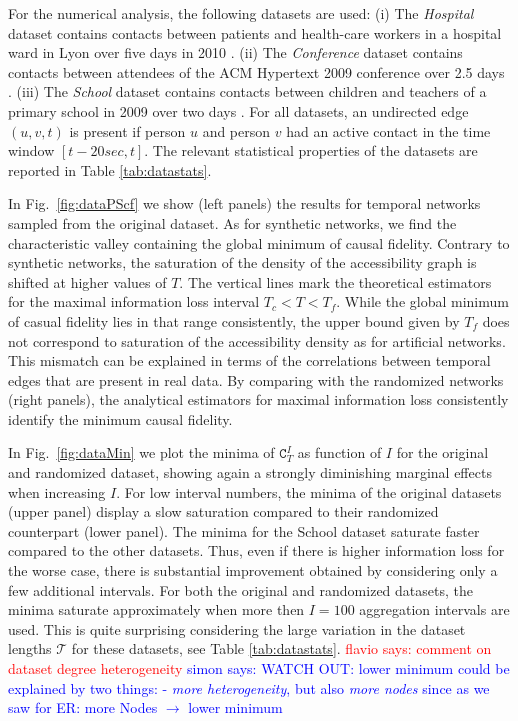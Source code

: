 \documentclass[%
 reprint,
 amsmath,amssymb,
 aps,
]{revtex4-2}
\newcommand{\fla}[1]{\textcolor{red}{flavio says: #1}}
\newcommand{\simon}[1]{\textcolor{blue}{simon says: #1}}
\begin{document}
For the numerical analysis, the following datasets are used:
(i) The \emph{Hospital} dataset contains contacts between patients and health-care workers in a hospital ward in Lyon over five days in 2010 \cite{hospital}.
(ii) The \emph{Conference} dataset contains contacts between attendees of the ACM Hypertext 2009 conference over 2.5 days \cite{hypertext}. 
(iii) The \emph{School} dataset contains contacts between children and teachers of a primary school in 2009 over two days \cite{primaryschool2,primaryschool1}. 
For all datasets, an undirected edge $(u,v,t)$ is present if person $u$ and person $v$ had an active contact in the time window $[t-20sec, t]$.
The relevant statistical properties of the datasets are reported in Table \ref{tab:datastats}.





In Fig.~\ref{fig:dataPScf} we show (left panels) the results for temporal networks sampled from the original dataset. As for synthetic networks, we find the characteristic valley containing the global minimum of causal fidelity. 
Contrary to synthetic networks, the saturation of the density of the accessibility graph is shifted at higher values of $T$. The vertical lines mark the theoretical estimators for the maximal information loss interval $T_c<T<T_f$. 
While the global minimum of casual fidelity  lies in that range consistently, the upper bound given by $T_f$ does not correspond to saturation of the accessibility density as for artificial networks. This mismatch can be explained in terms of the correlations between temporal edges that are present in real data.
By comparing with the randomized networks (right panels), the analytical estimators for maximal information loss consistently identify the minimum causal fidelity.

In Fig.~\ref{fig:dataMin} we plot the minima of $\mathtt{C}^I_T$ as function of $I$ for the original and randomized dataset, showing again a strongly diminishing marginal effects when increasing $I$.
For low interval numbers, the minima of the original datasets (upper panel) display a slow saturation compared to their randomized counterpart (lower panel).
The minima for the School dataset saturate faster compared to the other datasets. Thus, even if there is higher information loss for the worse case, there is substantial improvement obtained by considering only a few additional intervals.
For both the original and randomized datasets, the minima saturate approximately when more then $I=100$ aggregation intervals are used. This is quite surprising considering the large variation in the dataset lengths $\mathcal{T}$ for these datasets, see Table \ref{tab:datastats}. 
\fla{comment on dataset degree heterogeneity}
\simon{WATCH OUT: lower minimum could be explained by two things: - \textit{more heterogeneity}, but also \textit{more nodes} since as we saw for ER: more Nodes $\rightarrow$ lower minimum}
\end{document}
